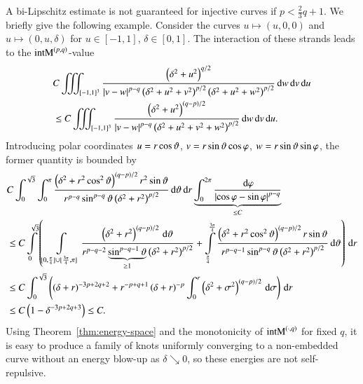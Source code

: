 \begin{remark}\label{rem:non-rep}
 A bi-Lipschitz estimate is not guaranteed for injective curves if $p<\frac23q+1$. We briefly give the following example.
 Consider the curves $u\mapsto (u,0,0)$ and $u\mapsto (0,u,\delta)$ for $u\in[-1,1]$, $\delta\in[0,1]$.
 The interaction of these strands leads to the $\E$-value
 \begin{align*}
  &C\iiint_{[-1,1]^3} \frac{\br{\delta^{2}+u^{2}}^{q/2}}{\abs{v-w}^{p-q}{{\br{\delta^{2}+u^2+v^{2}}^{p/2}\br{\delta^{2}+u^2+w^{2}}^{p/2}}}}\d w\d v\d u \\
  &\le C\iiint_{[-1,1]^3} \frac{\br{\delta^{2}+u^{2}}^{(q-p)/2}}{\abs{v-w}^{p-q}{{\br{\delta^{2}+u^2+v^{2}+w^{2}}^{p/2}}}}\d w\d v\d u.
 \end{align*}
 Introducing polar coordinates $u=r\cos\th$, $v=r\sin\th\cos\varphi$,
 $w=r\sin\th\sin\varphi$, the former quantity is bounded by
 \begin{align*}
  & C\int_0^{\sqrt3}\int_0^{\pi}
  \frac{\br{\delta^{2}+r^{2}\cos^{2}\th}^{(q-p)/2}r^2\sin\th}
  {r^{p-q}\sin^{p-q}\th\br{\delta^{2}+r^{2}}^{p/2}}
  \d\th\d r
  \underbrace{\int_{0}^{2\pi}\frac{\d\varphi}{\abs{\cos\varphi-\sin\varphi}^{p-q}}}_{{\le C}} \\
  & \le C\int\limits_0^{\sqrt3}\br{\int\limits_{[0,\frac\pi4]\cup[\frac{3\pi}4,\pi]}
  \frac{\br{\delta^{2}+r^{2}}^{(q-p)/2}\d\th}
  {r^{p-q-2}\underbrace{\sin^{p-q-1}\th}_{\ge1}\br{\delta^{2}+r^{2}}^{p/2}}
  +\int\limits_{\frac\pi4}^{\frac{3\pi}4}
  \frac{\br{\delta^{2}+r^{2}\cos^{2}\th}^{(q-p)/2}r\sin\th}
  {r^{p-q-1}\sin^{p-q}\th\br{\delta^{2}+r^{2}}^{p/2}}
  \d\th
  }\d r \\
  & \le C\int_0^{\sqrt3}\br{
  \br{\delta+r}^{-3p+2q+2}
  +r^{-p+q+1}\br{\delta+r}^{-p}
  \int_{0}^{r}\br{\delta^{2}+\sigma^{2}}^{(q-p)/2}\d\sigma
   }\d r \\
  &\le C\br{1-\delta^{-3p+2q+3}}\le C.
 \end{align*}
 Using Theorem~\ref{thm:energy-space}
 and the monotonicity of $\E[\cdot,q]$ for fixed $q$, it is easy to
 produce a family of knots uniformly converging to a non-embedded curve
 without an energy blow-up as $\delta\searrow0$,
 so these energies are not self-repulsive.
\end{remark}

